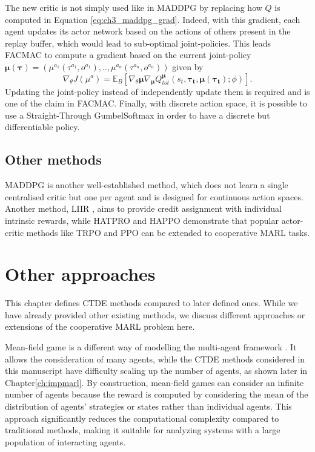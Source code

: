 The new critic is not simply used like in MADDPG by replacing how $Q$ is computed in Equation \ref{eq:ch3_maddpg_grad}.
Indeed, with this gradient, each agent updates its actor network based on the actions of others present in the replay buffer, which would lead to sub-optimal joint-policies.
This leads FACMAC to compute a gradient based on the current joint-policy $\mathbf{\mu}(\mathbf{\tau}) = (\mu^{a_1}(\tau^{a_1}, o^{a_1}), .., \mu^{a_n}(\tau^{a_n}, o^{a_n}))$ given by
\begin{equation}
\label{eq:ch3_facmac_grad}
    \nabla_\theta J(\mu^a) = \mathbb{E}_B\left[\nabla_{\theta} \mathbf{\mu} \nabla_{\mathbf{\mu}} Q_{tot}^{\mathbf{\mu}}(s_t, \mathbf{\tau_t}, \mathbf{\mu}(\mathbf{\tau_t}); \phi)\right].
\end{equation}
Updating the joint-policy instead of independently update them is required and is one of the claim in FACMAC.
Finally, with discrete action space, it is possible to use a Straight-Through GumbelSoftmax \citep{} in order to have a discrete but differentiable policy.

\subsection{Other methods}

MADDPG \citep{lowe2017multi} is another well-established method, which does not learn a single centralised critic but one per agent and is designed for continuous action spaces.
Another method, LIIR \citep{Du2019LIIRLearning}, aims to provide credit assignment with individual intrinsic rewards, while HATPRO and HAPPO \citep{kuba2021trust} demonstrate that popular actor-critic methods like TRPO \citep{schulman2015trust} and PPO \citep{schulman2017ppo} can be extended to cooperative MARL tasks.


\section{Other approaches}
\label{sec:ch3_further}
This chapter defines CTDE methods compared to later defined ones.
While we have already provided other existing methods, we discuss different approaches or extensions of the cooperative MARL problem here.

Mean-field game is a different way of modelling the multi-agent framework \citep{lauriere2022learning}.
It allows the consideration of many agents, while the CTDE methods considered in this manuscript have difficulty scaling up the number of agents, as shown later in Chapter\ref{ch:impmarl}.
By construction, mean-field games can consider an infinite number of agents because the reward is computed by considering the mean of the distribution of agents' strategies or states rather than individual agents.
This approach significantly reduces the computational complexity compared to traditional methods, making it suitable for analyzing systems with a large population of interacting agents.


